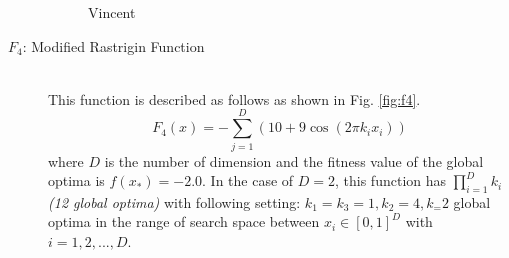 \documentclass[conference]{IEEEtran}
\begin{document}
\begin{description}
\begin{figure}[h]
\begin{center}
\caption{Vincent}
\label{fig:f3}
\end{center}
\end{figure}

\item[$F_4$: Modified Rastrigin Function]\mbox{}\\
 This function is described as follows as shown in Fig. \ref{fig:f4}.
 \begin{equation}
F_4(x) = -\sum_{j=1}^D (10+9 \cos(2 \pi k_i x_i)) 
\end{equation}
where $D$ is the number of dimension and the fitness value of the global optima is ${f(x_*)=-2.0}$. In the case of $D=2$, this function has $\prod_{i=1}^D k_i$ \textit{(12 global optima)} with following setting: $k_1=k_3=1, k_2=4, k_=2$  global optima in the range of search space between $x_i \in [0, 1]^D$ with $i=1,2,...,D$.


\end{description}
\end{document}

